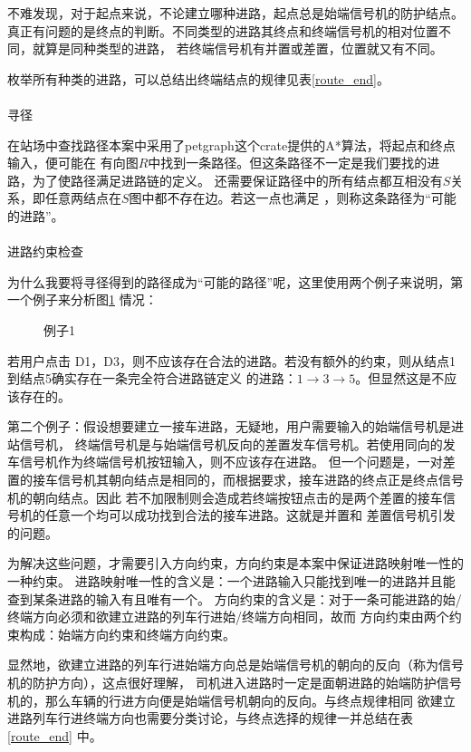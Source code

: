 不难发现，对于起点来说，不论建立哪种进路，起点总是始端信号机的防护结点。
真正有问题的是终点的判断。不同类型的进路其终点和终端信号机的相对位置不同，就算是同种类型的进路，
若终端信号机有并置或差置，位置就又有不同。

枚举所有种类的进路，可以总结出终端结点的规律见表\ref{route_end}。

\paragraph{}寻径

在站场中查找路径本案中采用了petgraph这个crate提供的A*算法，将起点和终点输入，便可能在
有向图$R$中找到一条路径。但这条路径不一定是我们要找的进路，为了使路径满足进路链的定义。
还需要保证路径中的所有结点都互相没有$S$关系，即任意两结点在$S$图中都不存在边。若这一点也满足
，则称这条路径为“可能的进路”。

\paragraph{}进路约束检查

为什么我要将寻径得到的路径成为“可能的路径”呢，这里使用两个例子来说明，第一个例子来分析图\ref{ens2} 情况：

\begin{figure}[ht]
    \centering
    
    \caption{\label{ens2}例子1}
\end{figure}

若用户点击 D1，D3，则不应该存在合法的进路。若没有额外的约束，则从结点1到结点5确实存在一条完全符合进路链定义
的进路：$1 \rightarrow 3 \rightarrow 5$。但显然这是不应该存在的。

第二个例子：假设想要建立一接车进路，无疑地，用户需要输入的始端信号机是进站信号机，
终端信号机是与始端信号机反向的差置发车信号机。若使用同向的发车信号机作为终端信号机按钮输入，则不应该存在进路。
但一个问题是，一对差置的接车信号机其朝向结点是相同的，而根据要求，接车进路的终点正是终点信号机的朝向结点。因此
若不加限制则会造成若终端按钮点击的是两个差置的接车信号机的任意一个均可以成功找到合法的接车进路。这就是并置和
差置信号机引发的问题。

为解决这些问题，才需要引入方向约束，方向约束是本案中保证进路映射唯一性的一种约束。
进路映射唯一性的含义是：一个进路输入只能找到唯一的进路并且能查到某条进路的输入有且唯有一个。
方向约束的含义是：对于一条可能进路的始/终端方向必须和欲建立进路的列车行进始/终端方向相同，故而
方向约束由两个约束构成：始端方向约束和终端方向约束。

显然地，欲建立进路的列车行进始端方向总是始端信号机的朝向的反向（称为信号机的防护方向），这点很好理解，
司机进入进路时一定是面朝进路的始端防护信号机的，那么车辆的行进方向便是始端信号机朝向的反向。与终点规律相同
欲建立进路列车行进终端方向也需要分类讨论，与终点选择的规律一并总结在表 \ref{route_end} 中。

